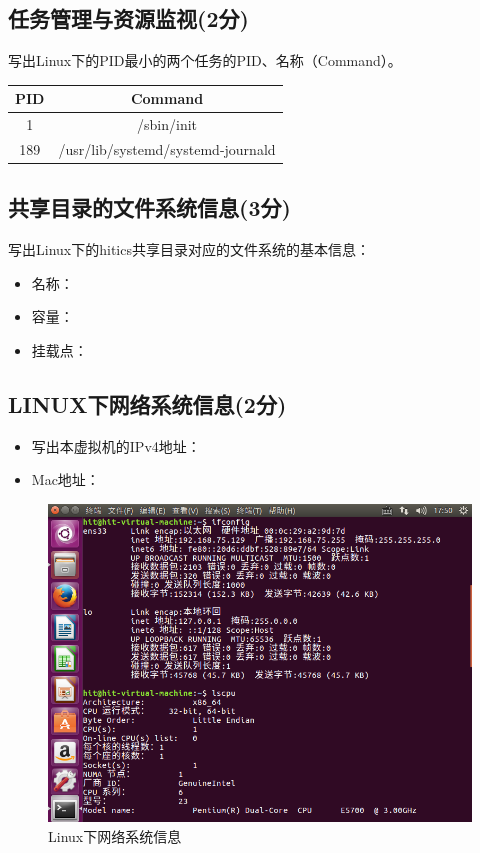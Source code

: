 \subsection{任务管理与资源监视(2分)}
写出Linux下的PID最小的两个任务的PID、名称（Command）。

\begin{tabular}{|c|c|}
	\hline 
	PID & Command \\ 
	\hline 
	1 & /sbin/init \\ 
	\hline 
	189 & /usr/lib/systemd/systemd-journald \\ 
	\hline 
\end{tabular} 

\subsection{共享目录的文件系统信息(3分)}
写出Linux下的hitics共享目录对应的文件系统的基本信息：

\begin{itemize}
	\item 名称：
	\item 容量：
	\item 挂载点：
\end{itemize}

\subsection{LINUX下网络系统信息(2分)}

\begin{itemize}
	\item 写出本虚拟机的IPv4地址：
	\item Mac地址：
\end{itemize}

\begin{figure}[H]
	\centering
	\includegraphics[width=0.7\linewidth]{figures/Lin-Net}
	\caption{Linux下网络系统信息}
	\label{fig:lin-net}
\end{figure}
